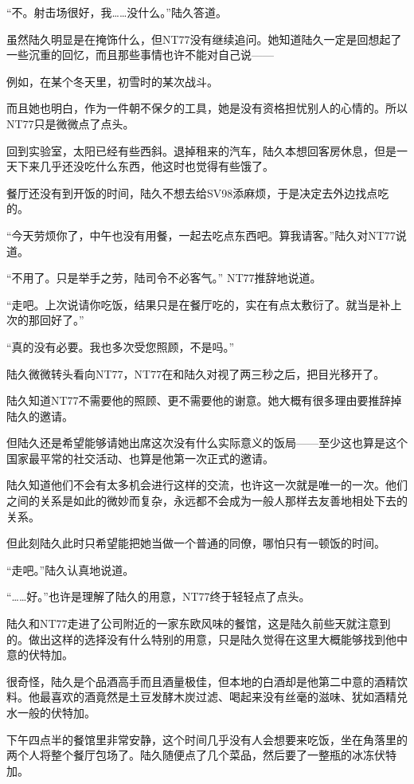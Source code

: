 “不。射击场很好，我……没什么。”陆久答道。

虽然陆久明显是在掩饰什么，但NT77没有继续追问。她知道陆久一定是回想起了一些沉重的回忆，而且那些事情也许不能对自己说——

例如，在某个冬天里，初雪时的某次战斗。

而且她也明白，作为一件朝不保夕的工具，她是没有资格担忧别人的心情的。所以NT77只是微微点了点头。

回到实验室，太阳已经有些西斜。退掉租来的汽车，陆久本想回客房休息，但是一天下来几乎还没吃什么东西，他这时也觉得有些饿了。

餐厅还没有到开饭的时间，陆久不想去给SV98添麻烦，于是决定去外边找点吃的。

“今天劳烦你了，中午也没有用餐，一起去吃点东西吧。算我请客。”陆久对NT77说道。

“不用了。只是举手之劳，陆司令不必客气。” NT77推辞地说道。

“走吧。上次说请你吃饭，结果只是在餐厅吃的，实在有点太敷衍了。就当是补上次的那回好了。”

“真的没有必要。我也多次受您照顾，不是吗。”

陆久微微转头看向NT77，NT77在和陆久对视了两三秒之后，把目光移开了。

陆久知道NT77不需要他的照顾、更不需要他的谢意。她大概有很多理由要推辞掉陆久的邀请。

但陆久还是希望能够请她出席这次没有什么实际意义的饭局——至少这也算是这个国家最平常的社交活动、也算是他第一次正式的邀请。

陆久知道他们不会有太多机会进行这样的交流，也许这一次就是唯一的一次。他们之间的关系是如此的微妙而复杂，永远都不会成为一般人那样去友善地相处下去的关系。

但此刻陆久此时只希望能把她当做一个普通的同僚，哪怕只有一顿饭的时间。

“走吧。”陆久认真地说道。

“……好。”也许是理解了陆久的用意，NT77终于轻轻点了点头。

陆久和NT77走进了公司附近的一家东欧风味的餐馆，这是陆久前些天就注意到的。做出这样的选择没有什么特别的用意，只是陆久觉得在这里大概能够找到他中意的伏特加。

很奇怪，陆久是个品酒高手而且酒量极佳，但本地的白酒却是他第二中意的酒精饮料。他最喜欢的酒竟然是土豆发酵木炭过滤、喝起来没有丝毫的滋味、犹如酒精兑水一般的伏特加。

下午四点半的餐馆里非常安静，这个时间几乎没有人会想要来吃饭，坐在角落里的两个人将整个餐厅包场了。陆久随便点了几个菜品，然后要了一整瓶的冰冻伏特加。

